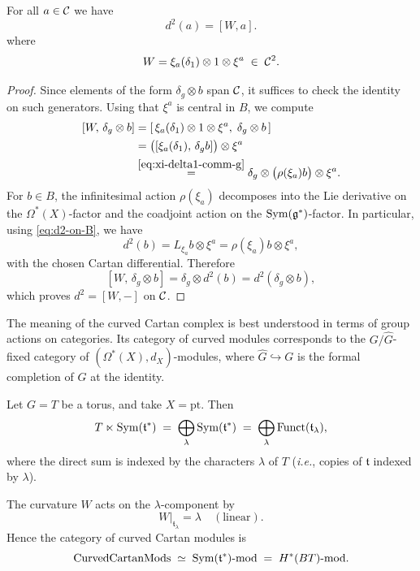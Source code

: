 \documentclass[12pt]{article}
\begin{document}
\begin{proposition}
For all $a\in{\mathcal{C}}$ we have
\[
d^2(a) = [W,a].
\]
where 
\[
W = \xi_a(\delta_1)\otimes 1\otimes \xi^a \;\in\; {\mathcal{C}}^2.
\]
\end{proposition}

\begin{proof}
Since elements of the form $\delta_g\otimes b$ span ${\mathcal{C}}$, it suffices
to check the identity on such generators.  Using that $\xi^a$ is central
in $B$, we compute
\[
\begin{aligned}
[W,\,\delta_g\otimes b]
&= [\,\xi_a(\delta_1)\otimes 1\otimes\xi^a,\;\delta_g\otimes b\,] \\
&= \bigl([\xi_a(\delta_1),\,\delta_g b]\bigr)\otimes\xi^a \\
&\overset{\eqref{eq:xi-delta1-comm-g}}=
   \delta_g\otimes\bigl(\rho(\xi_a)b\bigr)\otimes\xi^a.
\end{aligned}
\]
For $b\in B$, the infinitesimal action $\rho(\xi_a)$ decomposes into the
Lie derivative on the $\Omega^*(X)$-factor and the coadjoint action on
the $\operatorname{Sym}(\frak g^*)$-factor.  In particular, using \eqref{eq:d2-on-B},
we have
\[
d^2(b) = L_{\xi_a}b\otimes\xi^a = \rho(\xi_a)b\otimes\xi^a,
\]
with the chosen Cartan differential.  Therefore
\[
[W,\,\delta_g\otimes b]
= \delta_g\otimes d^2(b)
= d^2(\delta_g\otimes b),
\]
which proves $d^2 = [W,-]$ on ${\mathcal{C}}$.
\end{proof}

The meaning of the curved Cartan complex is best understood in terms of group actions on categories. Its category of curved modules corresponds to the $G/\hat{G}$-fixed category of $(\Omega^*(X), d_X)$-modules, where $\hat{G} \hookrightarrow G$ is the formal completion of $G$ at the identity.

\begin{example}
Let $G = T$ be a torus, and take $X = \mathrm{pt}$.  
Then
\[
T \ltimes \operatorname{Sym}(\mathfrak t^*)
\;=\;
\bigoplus_{\lambda} \operatorname{Sym}(\mathfrak t^*)
\;=\;
\bigoplus_{\lambda} \mathrm{Funct}(\mathfrak t_\lambda),
\]
where the direct sum is indexed by the characters $\lambda$ of $T$
(\emph{i.e.}, copies of $\mathfrak t$ indexed by $\lambda$).

The curvature $W$ acts on the $\lambda$-component by
\[
W|_{\mathfrak t_\lambda} = \lambda \quad (\text{linear}).
\]
Hence the category of curved Cartan modules is
\[
\text{CurvedCartanMods} \;\simeq\; \operatorname{Sym}(\mathfrak t^*)\text{-mod}
\;=\; H^*(BT)\text{-mod}.
\]
\end{example}
\end{document}
